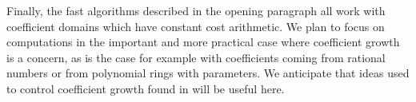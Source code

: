 Finally, the fast algorithms described in the opening paragraph all work with coefficient domains which have constant cost arithmetic. We plan to focus on computations in the important and more practical case where coefficient growth is a concern, as is the case for example with coefficients coming from rational numbers or from polynomial rings with parameters. We anticipate that ideas used to control coefficient growth found in \cite{bela2000} will be useful here. 
